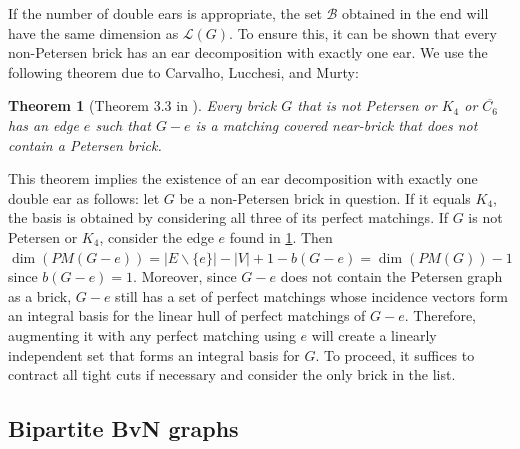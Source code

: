 \documentclass[11pt]{article}
\newcommand{\1}{\mathbf{1}}
\newcommand{\0}{\mathbf{0}}
\newcommand{\zB}{\mathcal B}
\newcommand{\zL}{\mathcal L}
\newtheorem{theorem}{Theorem}[section]
\begin{document}
If the number of double ears is appropriate, the set $\zB$ obtained in the end will have the same dimension as $\zL(G)$. To ensure this, it can be shown that every non-Petersen brick has an ear decomposition with exactly one ear. We use the following theorem due to Carvalho, Lucchesi, and Murty:
\begin{theorem}[Theorem $3.3$ in \cite{conj-lovasz}]\label{thm:brick-invariant-edge}
    Every brick $G$ that is not Petersen or $K_4$ or $\overline{C_6}$ has an edge $e$ such that $G-e$ is a matching covered near-brick that does not contain a Petersen brick. 
\end{theorem}

This theorem implies the existence of an ear decomposition with exactly one double ear as follows: let $G$ be a non-Petersen brick in question. If it equals $K_4$, the basis is obtained by considering all three of its perfect matchings. If $G$ is not Petersen or $K_4$, consider the edge $e$ found in \cref{thm:brick-invariant-edge}. Then $\dim(PM(G-e)) = |E\backslash \{e\}|-|V|+1-b(G-e) = \dim(PM(G))-1$ since $b(G-e)=1$. Moreover, since $G-e$ does not contain the Petersen graph as a brick, $G-e$ still has a set of perfect matchings whose incidence vectors form an integral basis for the linear hull of perfect matchings of $G-e$. Therefore, augmenting it with any perfect matching using $e$ will create a linearly independent set that forms an integral basis for $G$. To proceed, it suffices to contract all tight cuts if necessary and consider the only brick in the list. 

\subsection{Bipartite BvN graphs}
\end{document}
